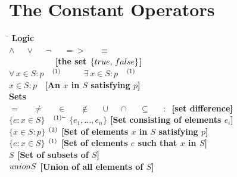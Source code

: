 \documentclass[fleqn,leqno]{article}
\newcommand{\notemark}[1]{$^{\mbox{\tiny(#1)}}$}
\begin{document}
\renewcommand{\contentsname}{Summary of \protect\tlaplus\protect\target{top}}
\showversions
\tableofcontents
\hideversions
\vfill 
\newpage
\section*{The Constant Operators}
\newcommand{\xins}{\ensuremath{x\in S}}
{\centering
\begin{tabbing}
\hspace*{1em}\=\+\kill
\bf \hspace*{-1em}Logic\\
$\land$ \ \ $\lor$ 
  \ \ $\lnot$ 
  \ \ $=>$ \ \ $\equiv$ \\
\TRUE \ \ \ \ \FALSE \ \ \ \ \BOOLEAN\ %
  {\small [the set $\{\TRUE,\, \FALSE\}$]}
\\
$\forall\, \xins : p$  \ 
   \notemark{1} \
\ \ \ $\exists\, \xins : p$
\   \notemark{1} 
\\ 
\CHOOSE $x\in S : p$ \ \small [An $x$ in $S$ satisfying $p$]
\\[.875\baselineskip]
%
{\bf \hspace*{-1em}Sets}\\
$=$ \ \ $\neq$ \ \ $\in$ \ \ $\notin$ 
  \ \ $\cup$ \ \ $\cap$ \ \ $\subseteq$ \ \ 
  $:\:$ {\small [set difference]}\\
$\{e : \xins \}$ \   \notemark{1} \hspace{.5em}\= \kill
%
$\{e_1, \ldots , e_n\}$     
  \> \small [Set consisting of elements $e_i$] \\
$\{x \in S : p\}$  \notemark{2} 
  \> \small [Set of elements $x$ in $S$ satisfying $p$] \\
$\{e : \xins \}$ \notemark{1} 
  \> \small [Set of elements $e$ such that $x$ in $S$] \\
\SUBSET $S$
  \> \small [Set of subsets of $S$] \\
$\UNION S$
  \> \small [Union of all elements of $S$]%
\\[.875\baselineskip]

\end{tabbing}}
\end{document}
